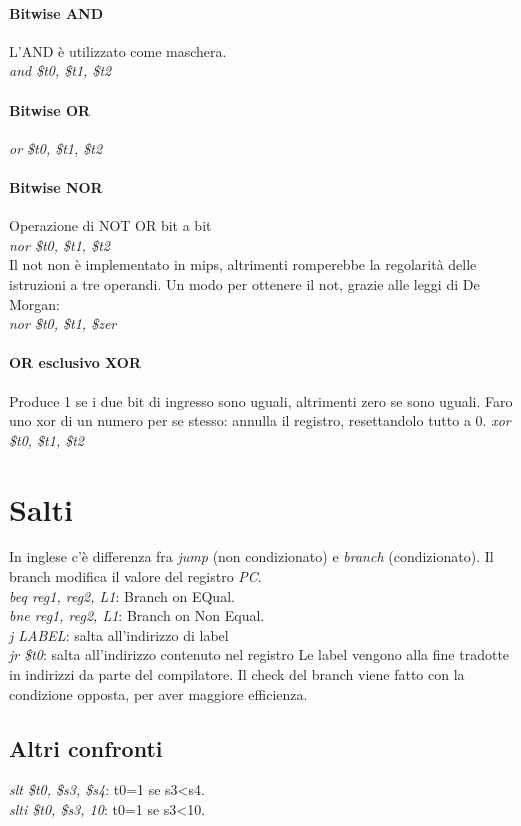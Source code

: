 \documentclass[class=book, crop=false]{standalone}
\begin{document}
\paragraph{Bitwise AND}
L'AND è utilizzato come maschera.\\
\emph{and \$t0, \$t1, \$t2}

\paragraph{Bitwise OR}
\emph{or \$t0, \$t1, \$t2}

\paragraph{Bitwise NOR}
Operazione di NOT OR bit a bit\\
\emph{nor \$t0, \$t1, \$t2}\\
Il not non è implementato in mips, altrimenti romperebbe la regolarità delle istruzioni a tre operandi. Un modo per ottenere il not, grazie alle leggi di De Morgan:\\
\emph{nor \$t0, \$t1, \$zer}

\paragraph{OR esclusivo XOR}
Produce 1 se i due bit di ingresso sono uguali, altrimenti zero se sono uguali. Faro uno xor di un numero per se stesso: annulla il registro, resettandolo tutto a 0.
\emph{xor \$t0, \$t1, \$t2}

\section{Salti}
In inglese c'è differenza fra \emph{jump} (non condizionato) e \emph{branch} (condizionato). Il branch modifica il valore del registro \emph{PC}.\\
\emph{beq reg1, reg2, L1}: Branch on EQual.\\
\emph{bne reg1, reg2, L1}: Branch on Non Equal.\\
\emph{j LABEL}: salta all'indirizzo di label\\
\emph{jr \$t0}: salta all'indirizzo contenuto nel registro
Le label vengono alla fine tradotte in indirizzi da parte del compilatore.
Il check del branch viene fatto con la condizione opposta, per aver maggiore efficienza.

\subsection{Altri confronti}
\emph{slt \$t0, \$s3, \$s4}: t0=1 se s3<s4.\\
\emph{slti \$t0, \$s3, 10}: t0=1 se s3<10.\\
\end{document}
